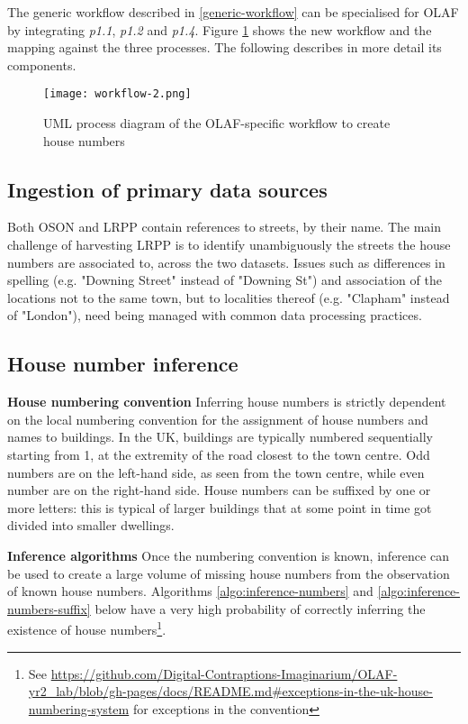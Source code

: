 The generic workflow described in \ref{generic-workflow} can be specialised for OLAF by integrating {\it p1.1}, {\it p1.2} and {\it p1.4}. Figure \ref{fig:workflow_2} shows the new workflow and the mapping against the three processes. The following describes in more detail its components.

\begin{figure}
	\texttt{[image: workflow-2.png]}
	\caption{UML process diagram of the OLAF-specific workflow to create house numbers}
	\label{fig:workflow_2}
\end{figure}

\subsection{Ingestion of primary data sources} 

Both OSON and LRPP contain references to streets, by their name. The main challenge of harvesting LRPP is to identify unambiguously the streets the house numbers are associated to, across the two datasets. Issues such as differences in spelling (e.g. "Downing Street" instead of "Downing St") and association of the locations not to the same town, but to localities thereof (e.g. "Clapham" instead of "London"), need being managed with common data processing practices.

\subsection{House number inference} 
\label{inference-algorithms} 

\textbf{House numbering convention} Inferring house numbers is strictly dependent on the local numbering convention for the assignment of house numbers and names to buildings. In the UK, buildings are typically numbered sequentially starting from 1, at the extremity of the road closest to the town centre. Odd numbers are on the left-hand side, as seen from the town centre, while even number are on the right-hand side. House numbers can be suffixed by one or more letters: this is typical of larger buildings that at some point in time got divided into smaller dwellings. 
        
\textbf{Inference algorithms} Once the numbering convention is known, inference can be used to create a large volume of missing house numbers from the observation of known house numbers. Algorithms \ref{algo:inference-numbers} and \ref{algo:inference-numbers-suffix} below have a very high probability of correctly inferring the existence of house numbers\footnote{See \url{https://github.com/Digital-Contraptions-Imaginarium/OLAF-yr2_lab/blob/gh-pages/docs/README.md#exceptions-in-the-uk-house-numbering-system} for exceptions in the convention}. 


